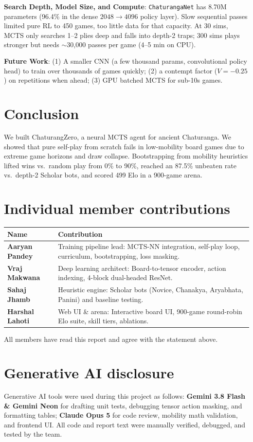 \documentclass[11pt,a4paper,twocolumn]{article}
\begin{document}
\textbf{Search Depth, Model Size, and Compute}: \texttt{ChaturangaNet} has 8.70M parameters (96.4\% in the dense $2048 \to 4096$ policy layer). Slow sequential passes limited pure RL to 450 games, too little data for that capacity. At 30 sims, MCTS only searches 1--2 plies deep and falls into depth-2 traps; 300 sims plays stronger but needs $\sim$30,000 passes per game (4--5 min on CPU).

\textbf{Future Work}: (1) A smaller CNN (a few thousand params, convolutional policy head) to train over thousands of games quickly; (2) a contempt factor ($V = -0.25$) on repetitions when ahead; (3) GPU batched MCTS for sub-10s games.

\section{Conclusion}
We built ChaturangZero, a neural MCTS agent for ancient Chaturanga. We showed that pure self-play from scratch fails in low-mobility board games due to extreme game horizons and draw collapse. Bootstrapping from mobility heuristics lifted wins vs.\ random play from 0\% to 90\%, reached an 87.5\% unbeaten rate vs.\ depth-2 Scholar bots, and scored 499 Elo in a 900-game arena.

\section*{Individual member contributions}
{\small
\begin{tabularx}{\linewidth}{@{}l X@{}}
\toprule
Name & Contribution \\
\midrule
\textbf{Aaryan Pandey} & Training pipeline lead: MCTS-NN integration, self-play loop, curriculum, bootstrapping, loss masking. \\
\textbf{Vraj Makwana} & Deep learning architect: Board-to-tensor encoder, action indexing, 4-block dual-headed ResNet. \\
\textbf{Sahaj Jhamb} & Heuristic engine: Scholar bots (Novice, Chanakya, Aryabhata, Panini) and baseline testing. \\
\textbf{Harshal Lahoti} & Web UI \& arena: Interactive board UI, 900-game round-robin Elo suite, skill tiers, ablations. \\
\bottomrule
\end{tabularx}}

\smallskip
\noindent All members have read this report and agree with the statement above.

\section*{Generative AI disclosure}
Generative AI tools were used during this project as follows: \textbf{Gemini 3.8 Flash \& Gemini Neon} for drafting unit tests, debugging tensor action masking, and formatting tables; \textbf{Claude Opus 5} for code review, mobility math validation, and frontend UI. All code and report text were manually verified, debugged, and tested by the team.
\end{document}
